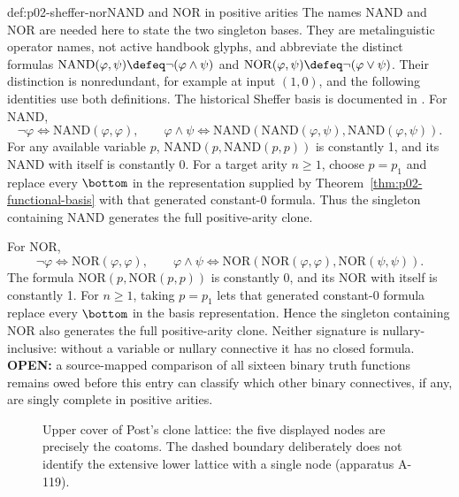 \begin{hbexample}{def:p02-sheffer-nor}{NAND and NOR in positive arities}
The names \(\mathrm{NAND}\) and \(\mathrm{NOR}\) are needed here to state
the two singleton bases.  They are metalinguistic operator names, not active
handbook glyphs, and abbreviate the distinct formulas
\(\mathrm{NAND}(\varphi,\psi)\defeq\neg(\varphi\land\psi)\) and
\(\mathrm{NOR}(\varphi,\psi)\defeq\neg(\varphi\lor\psi)\).  Their
distinction is nonredundant, for example at input \((1,0)\), and the following
identities use both definitions.  The historical Sheffer basis is documented
in \cite{Sheffer1913}.  For NAND,
\[
 \neg\varphi\Leftrightarrow\mathrm{NAND}(\varphi,\varphi),
 \qquad
 \varphi\land\psi\Leftrightarrow
 \mathrm{NAND}(\mathrm{NAND}(\varphi,\psi),
                \mathrm{NAND}(\varphi,\psi)).
\]
For any available variable \(p\),
\(\mathrm{NAND}(p,\mathrm{NAND}(p,p))\) is constantly 1, and its NAND
with itself is constantly 0.  For a target arity \(n\geq1\), choose
\(p=p_1\) and replace every \(\bottom\) in the representation supplied by
Theorem~\ref{thm:p02-functional-basis} with that generated constant-0
formula.  Thus the singleton containing NAND generates the full
positive-arity clone.

For NOR,
\[
 \neg\varphi\Leftrightarrow\mathrm{NOR}(\varphi,\varphi),
 \qquad
 \varphi\land\psi\Leftrightarrow
 \mathrm{NOR}(\mathrm{NOR}(\varphi,\varphi),
               \mathrm{NOR}(\psi,\psi)).
\]
The formula \(\mathrm{NOR}(p,\mathrm{NOR}(p,p))\) is constantly 0, and its
NOR with itself is constantly 1.  For \(n\geq1\), taking \(p=p_1\) lets
that generated constant-0 formula replace every \(\bottom\) in the basis
representation.  Hence the singleton containing NOR also generates the full
positive-arity clone.  Neither signature is
nullary-inclusive: without a variable or nullary connective it has no closed
formula.  \textbf{OPEN:} a source-mapped comparison of all sixteen binary truth
functions remains owed before this entry can classify which other binary
connectives, if any, are singly complete in positive arities.
\end{hbexample}

\begin{figure}[tp]
\centering
{}
\caption{Upper cover of Post's clone lattice: the five
displayed nodes are precisely the coatoms.  The dashed boundary deliberately
does not identify the extensive lower lattice with a single node
(apparatus A-119).}
\label{fig:p02-post-lattice}
\end{figure}
